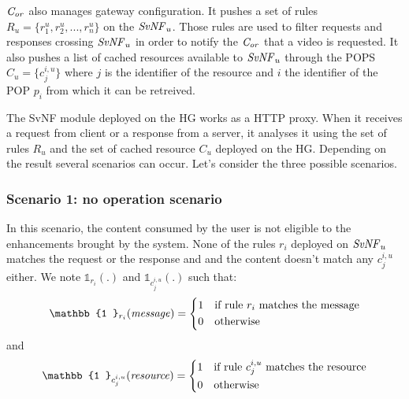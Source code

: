 $\mathit{C_{or}}$ also manages gateway configuration. It pushes a set of rules \(R_{u}=\{r^{u}_{1},r^{u}_{2},...,r^{u}_{n}\}\) on the $\mathit{SvNF}_{u}$. 
Those rules are used to filter requests and responses crossing $\mathit{SvNF}_{u}$ in order to notify the $\mathit{C_{or}}$ that a video is requested.
It also pushes a list of cached resources available to $\mathit{SvNF}_{u}$ through the POPS $C_{u}=\{c^{i,u}_{j} \}$ where $j$ is the identifier of the resource and $i$ the identifier of the POP $p_{i}$ from which it can be retreived.

The SvNF module deployed on the HG works as a HTTP proxy.
When it receives a request from client or a response from a server, it analyses it using the set of rules \(R_{u}\) and the set of cached resource $C_{u}$ deployed on the HG.
Depending on the result several scenarios can occur.
Let's consider the three possible scenarios.


\subsubsection*{Scenario 1: no operation scenario}\label{noop}

In this scenario, the content consumed by the user is not eligible to the enhancements brought by the system. None of the rules $r_{i}$ deployed on $\mathit{SvNF}_{u}$ matches the request or the response and and the content doesn't match any $c^{i,u}_{j}$ either. We note $\mathbb{1}_{r_{i}}(.)$ and $\mathbb{1}_{c^{i,u}_{j}}(.)$ such that:
\[
    \mathbb{1 }_{r_{i}}(\mathit{message})= 
\begin{dcases}
    1& \text{if rule $r_{i}$ matches the message} \\
    0              & \text{otherwise}
\end{dcases}
\]
and 
\[
    \mathbb{1 }_{c^{i,u}_{j}}(\mathit{resource})= 
\begin{dcases}
    1& \text{if rule $c^{i,u}_{j}$ matches the resource} \\
    0              & \text{otherwise}
\end{dcases}
\]

